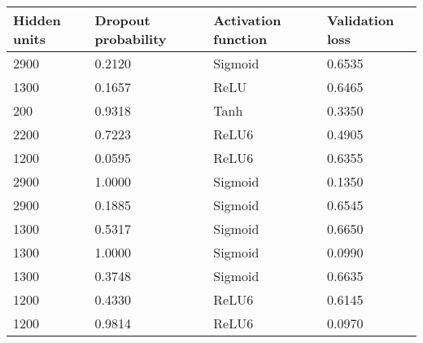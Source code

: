 \documentclass[12pt,fleqn]{article}
\begin{document}
\begin{table}[H]
	\begin{tabular}{|l|l|l|l|}
		\hline
		Hidden units & Dropout probability & Activation function & Validation loss \\ \hline
		2900         & 0.2120              & Sigmoid             & 0.6535          \\ \hline
		1300         & 0.1657              & ReLU                & 0.6465          \\ \hline
		200          & 0.9318              & Tanh                & 0.3350          \\ \hline
		2200         & 0.7223              & ReLU6               & 0.4905          \\ \hline
		1200         & 0.0595              & ReLU6               & 0.6355          \\ \hline
		2900         & 1.0000              & Sigmoid             & 0.1350          \\ \hline
		2900         & 0.1885              & Sigmoid             & 0.6545          \\ \hline
		1300         & 0.5317              & Sigmoid             & 0.6650          \\ \hline
		1300         & 1.0000              & Sigmoid             & 0.0990          \\ \hline
		1300         & 0.3748              & Sigmoid             & 0.6635          \\ \hline
		1200         & 0.4330              & ReLU6               & 0.6145          \\ \hline
		1200         & 0.9814              & ReLU6               & 0.0970          \\ \hline
	\end{tabular}
\end{table}
\end{document}
